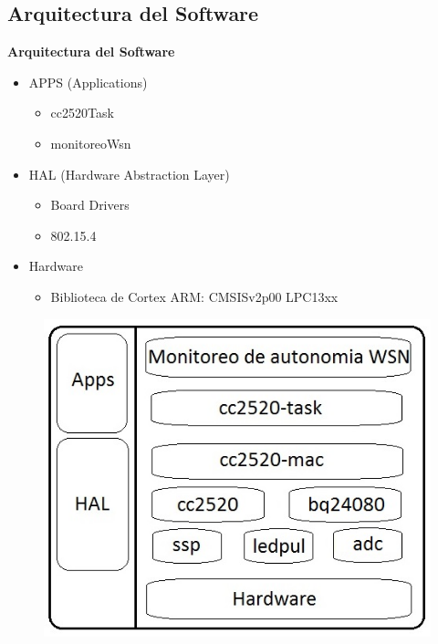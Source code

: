 \documentclass[aspectratio=43, handout]{beamer}
\begin{document}
\subsection[Arquitectura]{Arquitectura del Software}
\begin{frame}{\textbf{\LARGE{Arquitectura del Software}}}

\begin{minipage}[c]{1.0\linewidth}
	\begin{minipage}[c]{0.5\linewidth}
		\begin{itemize}
			\vspace{20px}
			\item APPS (Applications)
			\begin{itemize}
			\item cc2520Task
			\item monitoreoWsn
			\vspace{10px}
			\end{itemize}
			\item HAL (Hardware Abstraction Layer)
			\begin{itemize}
			\item Board Drivers
			\item 802.15.4
			\vspace{10px}
			\end{itemize}						
			\item Hardware
			\begin{itemize}
			\item Biblioteca de Cortex ARM: CMSISv2p00 LPC13xx
			\vspace{10px}
			\end{itemize}
		\end{itemize}	
	  \end{minipage}
	  \begin{minipage}[c]{0.4\linewidth}
		\begin{figure}[H]
			{\includegraphics[width=1.2\textwidth]{./imagenes/arq.png}}
		\end{figure}	  	  	
	  \end{minipage}
\end{minipage}

\end{frame}
\end{document}
